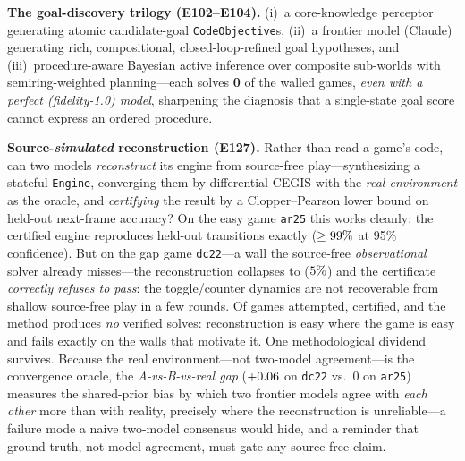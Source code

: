 \documentclass[11pt]{article}
\begin{document}
\textbf{The goal-discovery trilogy (E102--E104).} (i)~a core-knowledge perceptor generating atomic
candidate-goal \texttt{CodeObjective}s, (ii)~a frontier model (Claude) generating rich, compositional,
closed-loop-refined goal hypotheses, and (iii)~procedure-aware Bayesian active inference over composite
sub-worlds with semiring-weighted planning---each solves \textbf{0} of the walled games, \emph{even with
a perfect (fidelity-1.0) model}, sharpening the diagnosis that a single-state goal score cannot express an
ordered procedure.

\textbf{Source-\emph{simulated} reconstruction (E127).} Rather than read a game's code, can two models
\emph{reconstruct} its engine from source-free play---synthesizing a stateful \texttt{Engine}, converging
them by differential CEGIS with the \emph{real environment} as the oracle, and \emph{certifying} the
result by a Clopper--Pearson lower bound on held-out next-frame accuracy? On the easy game \texttt{ar25}
this works cleanly: the certified engine reproduces \ArcSimEasyExact{} held-out transitions exactly
($\geq99\%$ at 95\% confidence). But on the gap game \texttt{dc22}---a wall the source-free
\emph{observational} solver already misses---the reconstruction collapses to \ArcSimGapExact{}
($5\%$) and the certificate \emph{correctly refuses to pass}: the toggle/counter dynamics are
not recoverable from shallow source-free play in a few rounds. Of \ArcSimAttempted{} games attempted,
\ArcSimCertified{} certified, and the method produces \emph{no} verified solves: reconstruction is easy
where the game is easy and fails exactly on the walls that motivate it. One methodological dividend
survives. Because the real environment---not two-model agreement---is the convergence oracle, the
\emph{A-vs-B-vs-real gap} ($+0.06$ on \texttt{dc22} vs.\ $0$ on \texttt{ar25}) measures the
shared-prior bias by which two frontier models agree with \emph{each other} more than with reality,
precisely where the reconstruction is unreliable---a failure mode a naive two-model consensus would hide,
and a reminder that ground truth, not model agreement, must gate any source-free claim.
\end{document}
